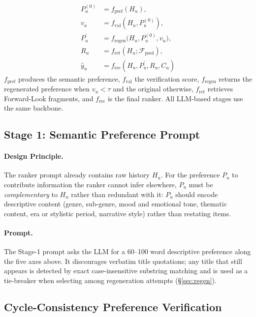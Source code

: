 \documentclass[11pt]{article}
\begin{document}
\begin{equation}
\begin{aligned}
P_u^{(0)} &= f_\text{pref}(H_u), \\
v_u &= f_\text{val}(H_u, P_u^{(0)}), \\
P_u^{'} &= f_\text{regen}\bigl(H_u, P_u^{(0)}, v_u\bigr), \\
R_u &= f_\text{ret}(H_u; \mathcal{F}_\text{pool}), \\
\hat{y}_u &= f_\text{rec}(H_u, P_u^{'}, R_u, C_u)
\end{aligned}
\label{eq:overall}
\end{equation}
$f_\text{pref}$ produces the semantic preference, $f_\text{val}$ the verification score, $f_\text{regen}$ returns the regenerated preference when $v_u < \tau$ and the original otherwise, $f_\text{ret}$ retrieves Forward-Look fragments, and $f_\text{rec}$ is the final ranker. All LLM-based stages use the same backbone.

\subsection{Stage 1: Semantic Preference Prompt\label{sec:stage1}}
\paragraph{Design Principle.}
The ranker prompt already contains raw history $H_u$. For the preference $P_u$ to contribute information the ranker cannot infer elsewhere, $P_u$ must be \emph{complementary} to $H_u$ rather than redundant with it: $P_u$ should encode descriptive content (genre, sub-genre, mood and emotional tone, thematic content, era or stylistic period, narrative style) rather than restating items.

\paragraph{Prompt.}
The Stage-1 prompt asks the LLM for a 60--100 word descriptive preference along the five axes above. It discourages verbatim title quotations; any title that still appears is detected by exact case-insensitive substring matching and is used as a tie-breaker when selecting among regeneration attempts (\S\ref{sec:regen}).

\subsection{Cycle-Consistency Preference Verification\label{sec:pv}}
\end{document}
